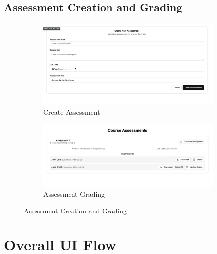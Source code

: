 \documentclass[a4paper, 11pt]{scrreprt}
\begin{document}
\subsection{Assessment Creation and Grading}
\begin{figure}[H]
    \centering
    \begin{subfigure}[b]{0.45\textwidth}
        \centering
        \includegraphics[width=\textwidth]{UI/TeacherCreateAssessment.jpg}
        \caption{Create Assessment}
    \end{subfigure}
    \hfill
    \begin{subfigure}[b]{0.45\textwidth}
        \centering
        \includegraphics[width=\textwidth]{UI/TeacherAssessment.jpg}
        \caption{Assessment Grading}
    \end{subfigure}
    \caption{Assessment Creation and Grading}
\end{figure}

\section{Overall UI Flow}
\end{document}
